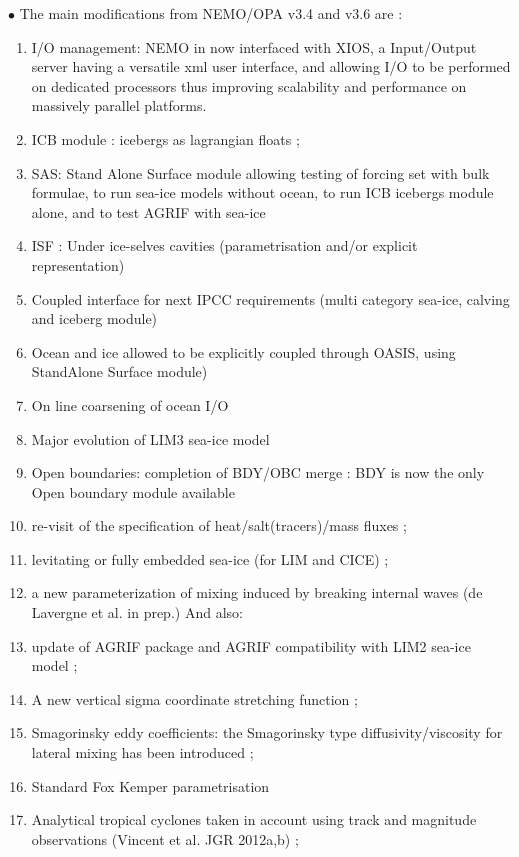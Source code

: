 \documentclass[NEMO_book]{subfiles}
\begin{document}
 \vspace{1cm}
$\bullet$ The main modifications from NEMO/OPA v3.4 and  v3.6 are :\\
\begin{enumerate}
\item I/O management: NEMO in now interfaced with XIOS, a Input/Output server having a versatile xml user interface, and 
allowing I/O to be performed on dedicated processors thus improving scalability and performance on massively parallel platforms. 
\item ICB module \citep{Marsh_GMD2015}: icebergs as lagrangian floats ; 
\item SAS: Stand Alone Surface module allowing testing of forcing set with bulk formulae, to run sea-ice models without ocean, to run ICB icebergs module alone, and to test AGRIF with sea-ice
\item ISF : Under ice-selves cavities (parametrisation and/or explicit representation)
\item Coupled interface for next IPCC requirements (multi category sea-ice, calving and iceberg module)
\item Ocean and ice allowed to be explicitly coupled through OASIS, using StandAlone Surface module)
\item On line coarsening of ocean I/O
\item Major evolution of LIM3 sea-ice model \citep{Rousset_GMD2015}
\item Open boundaries: completion of BDY/OBC merge : BDY is now the only Open boundary module available
\item re-visit of the specification of heat/salt(tracers)/mass fluxes ;
\item levitating or fully embedded sea-ice (for LIM and CICE) ;
\item a new parameterization of mixing induced by breaking internal waves (de Lavergne et al. in prep.)
And also:
\item update of AGRIF package and AGRIF compatibility with LIM2 sea-ice model ;
\item A new vertical sigma coordinate stretching function \citep{Siddorn_Furner_OM12} ;
\item Smagorinsky eddy coefficients: the \cite{Griffies_Hallberg_MWR00} Smagorinsky type diffusivity/viscosity for lateral mixing has been introduced ;
\item Standard Fox Kemper parametrisation
\item Analytical tropical cyclones taken in account using track and magnitude observations (Vincent et al. JGR 2012a,b) ;

\end{enumerate}
\end{document}
